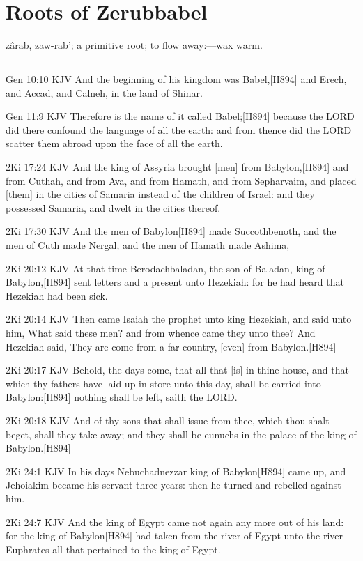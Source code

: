 \documentclass{book}
\begin{document}
\chapter{Roots of Zerubbabel}

zârab, zaw-rab'; a primitive root; to flow away:—wax warm.

\section{}
Gen 10:10 KJV
And the beginning of his kingdom was Babel,[H894] and Erech, and Accad, and Calneh, in the land of Shinar.

Gen 11:9 KJV
Therefore is the name of it called Babel;[H894] because the LORD did there confound the language of all the earth: and from thence did the LORD scatter them abroad upon the face of all the earth.

2Ki 17:24 KJV
And the king of Assyria brought [men] from Babylon,[H894] and from Cuthah, and from Ava, and from Hamath, and from Sepharvaim, and placed [them] in the cities of Samaria instead of the children of Israel: and they possessed Samaria, and dwelt in the cities thereof.

2Ki 17:30 KJV
And the men of Babylon[H894] made Succothbenoth, and the men of Cuth made Nergal, and the men of Hamath made Ashima,

2Ki 20:12 KJV
At that time Berodachbaladan, the son of Baladan, king of Babylon,[H894] sent letters and a present unto Hezekiah: for he had heard that Hezekiah had been sick.

2Ki 20:14 KJV
Then came Isaiah the prophet unto king Hezekiah, and said unto him, What said these men? and from whence came they unto thee? And Hezekiah said, They are come from a far country, [even] from Babylon.[H894]

2Ki 20:17 KJV
Behold, the days come, that all that [is] in thine house, and that which thy fathers have laid up in store unto this day, shall be carried into Babylon:[H894] nothing shall be left, saith the LORD.

2Ki 20:18 KJV
And of thy sons that shall issue from thee, which thou shalt beget, shall they take away; and they shall be eunuchs in the palace of the king of Babylon.[H894]

2Ki 24:1 KJV
In his days Nebuchadnezzar king of Babylon[H894] came up, and Jehoiakim became his servant three years: then he turned and rebelled against him.

2Ki 24:7 KJV
And the king of Egypt came not again any more out of his land: for the king of Babylon[H894] had taken from the river of Egypt unto the river Euphrates all that pertained to the king of Egypt.
\end{document}
